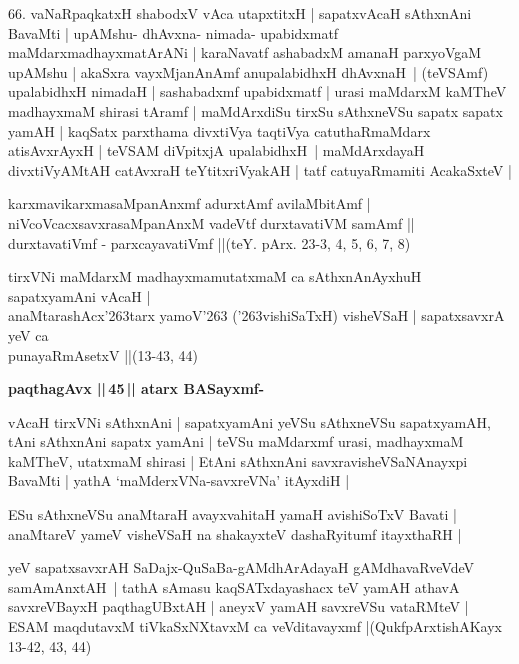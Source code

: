 \begin{artha}
66. vaNaRpaqkatxH shabodxV vAca utapxtitxH | sapatxvAcaH sAthxnAni BavaMti |\label{153}
upAMshu- dhAvxna- nimada- upa\-bidxmatf maMdarxmadhayxmatArANi | karaNavatf
ashabadxM amanaH parxyoVgaM upAMshu | akaSxra vayxMjanAnAmf anupalabidhxH dhAvxnaH~|
(teVSAmf) upalabidhxH nimadaH | sashabadxmf upabidxmatf | urasi maMdarxM kaMTheV madhayxmaM shirasi tAramf | maMdArxdiSu tirxSu sAthxneVSu sapatx sapatx yamAH | kaqSatx parxthama divxtiVya taqtiVya catuthaRmaMdarx atisAvxrAyxH | teVSAM diVpitxjA upalabidhxH~| maMdArxdayaH divxtiVyAMtAH catAvxraH teYtitxriVyakAH | tatf catuyaRmamiti AcakaSxteV |
\end{artha}

\begin{shloka}
karxmavikarxmasaMpanAnxmf adurxtAmf avilaMbitAmf |\\
niVcoVcacxsavxrasaMpanAnxM vadeVtf durxtavatiVM samAmf ||\\
durxtavatiVmf - parxcayavatiVmf ||\hfill{(teY. pArx. 23-3, 4, 5, 6, 7, 8)}
\end{shloka}

\begin{shloka}
tirxVNi maMdarxM madhayxmamutatxmaM ca sAthxnAnAyxhuH sapatxyamAni vAcaH |\\\label{154}
anaMtarashAcx\char'263tarx yamoV\char'263 (\char'263vishiSaTxH) visheVSaH |
sapatxsavxrA yeV ca\\
punayaRmAsetxV ||\hfill{(13-43, 44)}
\end{shloka}

{\bigskip
\noindent
{\large\bf paqthagAvx ||\,45\,|| atarx BASayxmf-}}
\medskip

\noindent
\begin{artha}
vAcaH tirxVNi sAthxnAni | sapatxyamAni yeVSu sAthxneVSu sapatxyamAH, tAni sAthxnAni sapatx yamAni | teVSu maMdarxmf urasi, madhayxmaM kaMTheV, utatxmaM shirasi | EtAni sAthxnAni savxravisheVSaNAnayxpi BavaMti | yathA `maMderxVNa-savxreVNa' itAyxdiH |
\end{artha}

\begin{shloka}
ESu sAthxneVSu anaMtaraH avayxvahitaH yamaH avishiSoTxV Bavati |\\
anaMtareV yameV visheVSaH na shakayxteV dashaRyitumf itayxthaRH |
\end{shloka}

\noindent
\begin{artha}
yeV sapatxsavxrAH SaDajx-QuSaBa-gAMdhArAdayaH gAMdhavaRveVdeV samAmAnxtAH~| tathA sAmasu kaqSATxdayashacx teV yamAH athavA savxreVBayxH paqthagUBxtAH | aneyxV yamAH savxreVSu vataRMteV | ESAM maqdutavxM tiVkaSxNXtavxM ca veVditavayxmf |\hfill{(QukfpArxtishAKayx 13-42, 43, 44)}
\end{artha}

